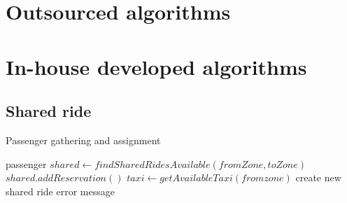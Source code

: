 \section{Outsourced algorithms}

\section{In-house developed algorithms}
\subsection{Shared ride}
Passenger gathering and assignment
\begin{algorithmic}
  {passenger}
  \State $ shared \gets findSharedRidesAvailable(fromZone, toZone) $
    \State $ shared.addReservation() $
  \Else
    \State $ taxi \gets getAvailableTaxi(fromzone) $
      \State create new shared ride
    \Else
      \State error message
    \EndIf
  \EndIf
 \EndFunction
\end{algorithmic}




